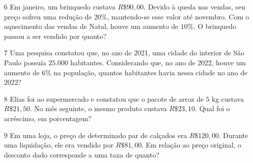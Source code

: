 \num{6} Em janeiro, um brinquedo custava $R\$ 90,00$. Devido à queda nas
vendas, seu preço sofreu uma redução de $20\%$, mantendo-se esse valor até
novembro. Com o aquecimento das vendas de Natal, houve um aumento de
$10\%$. O brinquedo passou a ser vendido por quanto?


\num{7}  Uma pesquisa constatou que, no ano de 2021, uma cidade do interior de
São Paulo possuía $25.000$ habitantes. Considerando que, no ano de 2022,
houve um aumento de $6\%$ na população, quantos habitantes havia nessa
cidade no ano de 2022?


\num{8}  Elias foi ao supermercado e constatou que o pacote de arroz de $5$ kg
custava $R\$ 21,50$. No mês seguinte, o mesmo produto custava $R\$ 23,10$.
Qual foi o acréscimo, em porcentagem?

\begin{emptybox}







\end{emptybox}

\num{9} Em uma loja, o preço de determinado par de calçados era
$R\$ 120,00$. Durante uma liquidação, ele era vendido por $R\$ 81,00$. Em
relação ao preço original, o desconto dado corresponde a uma taxa de quanto?

